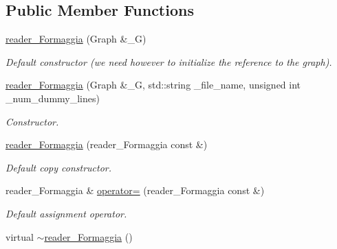 \subsection*{Public Member Functions}
\begin{DoxyCompactItemize}
\item 
\hypertarget{classfinal_ac405f6106b4f8e90cb06dd52284983c2}{
\hyperlink{classfinal_ac405f6106b4f8e90cb06dd52284983c2}{reader\_\-Formaggia} (Graph \&\_\-G)}
\label{classfinal_ac405f6106b4f8e90cb06dd52284983c2}

\begin{DoxyCompactList}\small\item\em Default constructor (we need however to initialize the reference to the graph). \item\end{DoxyCompactList}\item 
\hypertarget{classfinal_a712036b0fd3396380d5c393453929f29}{
\hyperlink{classfinal_a712036b0fd3396380d5c393453929f29}{reader\_\-Formaggia} (Graph \&\_\-G, std::string \_\-file\_\-name, unsigned int \_\-num\_\-dummy\_\-lines)}
\label{classfinal_a712036b0fd3396380d5c393453929f29}

\begin{DoxyCompactList}\small\item\em Constructor. \item\end{DoxyCompactList}\item 
\hypertarget{classfinal_a5be0850fa08372356ff146355b887693}{
\hyperlink{classfinal_a5be0850fa08372356ff146355b887693}{reader\_\-Formaggia} (reader\_\-Formaggia const \&)}
\label{classfinal_a5be0850fa08372356ff146355b887693}

\begin{DoxyCompactList}\small\item\em Default copy constructor. \item\end{DoxyCompactList}\item 
\hypertarget{classfinal_a02e28eddd4f99661a55bd9f52641db44}{
reader\_\-Formaggia \& \hyperlink{classfinal_a02e28eddd4f99661a55bd9f52641db44}{operator=} (reader\_\-Formaggia const \&)}
\label{classfinal_a02e28eddd4f99661a55bd9f52641db44}

\begin{DoxyCompactList}\small\item\em Default assignment operator. \item\end{DoxyCompactList}\item 
\hypertarget{classfinal_a459de677ac9395a35062c28c523bf4a3}{
virtual \hyperlink{classfinal_a459de677ac9395a35062c28c523bf4a3}{$\sim$reader\_\-Formaggia} ()}
\label{classfinal_a459de677ac9395a35062c28c523bf4a3}


\end{DoxyCompactItemize}
